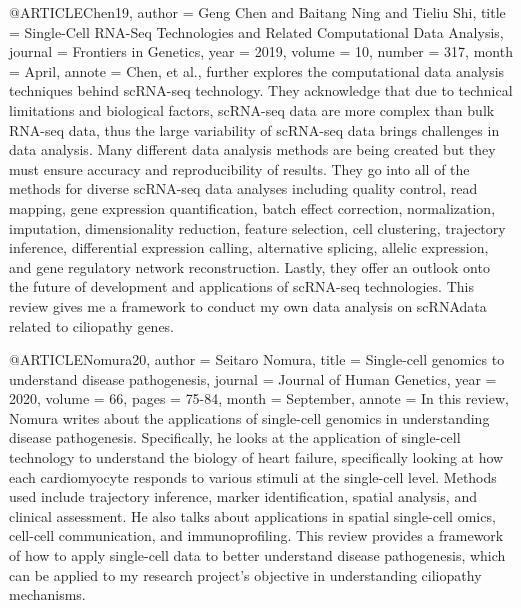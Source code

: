 @ARTICLE{Chen19,
  author    = {Geng Chen and Baitang Ning and Tieliu Shi},
  title     = {Single-Cell RNA-Seq Technologies and Related Computational Data Analysis},
  journal   = {Frontiers in Genetics},
  year      = {2019},
  volume    = {10},
  number    = {317},
  month     = {April},
  annote    = {Chen, et al., further explores the computational data analysis techniques behind scRNA-seq technology. They acknowledge that due to technical limitations and biological factors, scRNA-seq data are more complex than bulk RNA-seq data, thus the large variability of scRNA-seq data brings challenges in data analysis. Many different data analysis methods are being created but they must ensure accuracy and reproducibility of results. They go into all of the methods for diverse scRNA-seq data analyses including quality control, read mapping, gene expression quantification, batch effect correction, normalization, imputation, dimensionality reduction, feature selection, cell clustering, trajectory inference, differential expression calling, alternative splicing, allelic expression, and gene regulatory network reconstruction. Lastly, they offer an outlook onto the future of development and applications of scRNA-seq technologies. This review gives me a framework to conduct my own data analysis on scRNAdata related to ciliopathy genes. }
}

@ARTICLE{Nomura20,
  author    = {Seitaro Nomura},
  title     = {Single-cell genomics to understand disease pathogenesis},
  journal   = {Journal of Human Genetics},
  year      = {2020},
  volume    = {66},
  pages    = {75-84},
  month     = {September},
  annote    = {In this review, Nomura writes about the applications of single-cell genomics in understanding disease pathogenesis. Specifically, he looks at the application of single-cell technology to understand the biology of heart failure, specifically looking at how each cardiomyocyte responds to various stimuli at the single-cell level. Methods used include trajectory inference, marker identification, spatial analysis, and clinical assessment. He also talks about applications in spatial single-cell omics, cell-cell communication, and immunoprofiling. This review provides a framework of how to apply single-cell data to better understand disease pathogenesis, which can be applied to my research project’s objective in understanding ciliopathy mechanisms.}
}


